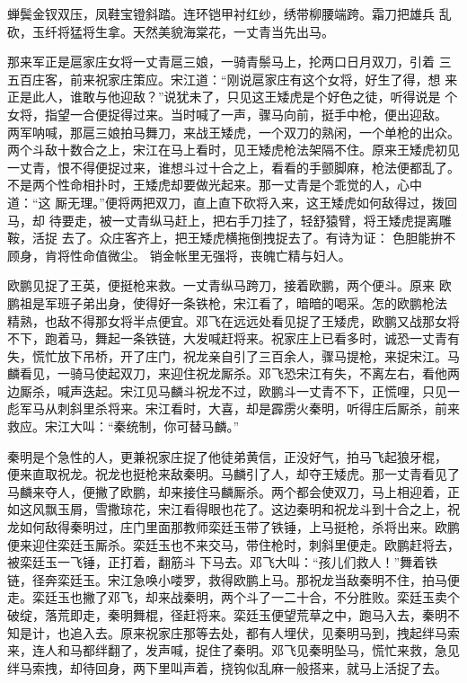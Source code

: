 蝉鬓金钗双压，凤鞋宝镫斜踏。连环铠甲衬红纱，绣带柳腰端跨。霜刀把雄兵
乱砍，玉纤将猛将生拿。天然美貌海棠花，一丈青当先出马。

那来军正是扈家庄女将一丈青扈三娘，一骑青鬃马上，抡两口日月双刀，引着
三五百庄客，前来祝家庄策应。宋江道：“刚说扈家庄有这个女将，好生了得，想
来正是此人，谁敢与他迎敌？”说犹未了，只见这王矮虎是个好色之徒，听得说是
个女将，指望一合便捉得过来。当时喊了一声，骤马向前，挺手中枪，便出迎敌。
两军呐喊，那扈三娘拍马舞刀，来战王矮虎，一个双刀的熟闲，一个单枪的出众。
两个斗敌十数合之上，宋江在马上看时，见王矮虎枪法架隔不住。原来王矮虎初见
一丈青，恨不得便捉过来，谁想斗过十合之上，看看的手颤脚麻，枪法便都乱了。
不是两个性命相扑时，王矮虎却要做光起来。那一丈青是个乖觉的人，心中道：“这
厮无理。”便将两把双刀，直上直下砍将入来，这王矮虎如何敌得过，拨回马，却
待要走，被一丈青纵马赶上，把右手刀挂了，轻舒猿臂，将王矮虎提离雕鞍，活捉
去了。众庄客齐上，把王矮虎横拖倒拽捉去了。有诗为证：
色胆能拚不顾身，肯将性命值微尘。
销金帐里无强将，丧魄亡精与妇人。

欧鹏见捉了王英，便挺枪来救。一丈青纵马跨刀，接着欧鹏，两个便斗。原来
欧鹏祖是军班子弟出身，使得好一条铁枪，宋江看了，暗暗的喝采。怎的欧鹏枪法
精熟，也敌不得那女将半点便宜。邓飞在远远处看见捉了王矮虎，欧鹏又战那女将
不下，跑着马，舞起一条铁链，大发喊赶将来。祝家庄上已看多时，诚恐一丈青有
失，慌忙放下吊桥，开了庄门，祝龙亲自引了三百余人，骤马提枪，来捉宋江。马
麟看见，一骑马使起双刀，来迎住祝龙厮杀。邓飞恐宋江有失，不离左右，看他两
边厮杀，喊声迭起。宋江见马麟斗祝龙不过，欧鹏斗一丈青不下，正慌哩，只见一
彪军马从刺斜里杀将来。宋江看时，大喜，却是霹雳火秦明，听得庄后厮杀，前来
救应。宋江大叫：“秦统制，你可替马麟。”

秦明是个急性的人，更兼祝家庄捉了他徒弟黄信，正没好气，拍马飞起狼牙棍，
便来直取祝龙。祝龙也挺枪来敌秦明。马麟引了人，却夺王矮虎。那一丈青看见了
马麟来夺人，便撇了欧鹏，却来接住马麟厮杀。两个都会使双刀，马上相迎着，正
如这风飘玉屑，雪撒琼花，宋江看得眼也花了。这边秦明和祝龙斗到十合之上，祝
龙如何敌得秦明过，庄门里面那教师栾廷玉带了铁锤，上马挺枪，杀将出来。欧鹏
便来迎住栾廷玉厮杀。栾廷玉也不来交马，带住枪时，刺斜里便走。欧鹏赶将去，
被栾廷玉一飞锤，正打着，翻筋斗下马去。邓飞大叫：“孩儿们救人！”舞着铁
链，径奔栾廷玉。宋江急唤小喽罗，救得欧鹏上马。那祝龙当敌秦明不住，拍马便
走。栾廷玉也撇了邓飞，却来战秦明，两个斗了一二十合，不分胜败。栾廷玉卖个
破绽，落荒即走，秦明舞棍，径赶将来。栾廷玉便望荒草之中，跑马入去，秦明不
知是计，也追入去。原来祝家庄那等去处，都有人埋伏，见秦明马到，拽起绊马索
来，连人和马都绊翻了，发声喊，捉住了秦明。邓飞见秦明坠马，慌忙来救，急见
绊马索拽，却待回身，两下里叫声着，挠钩似乱麻一般搭来，就马上活捉了去。

